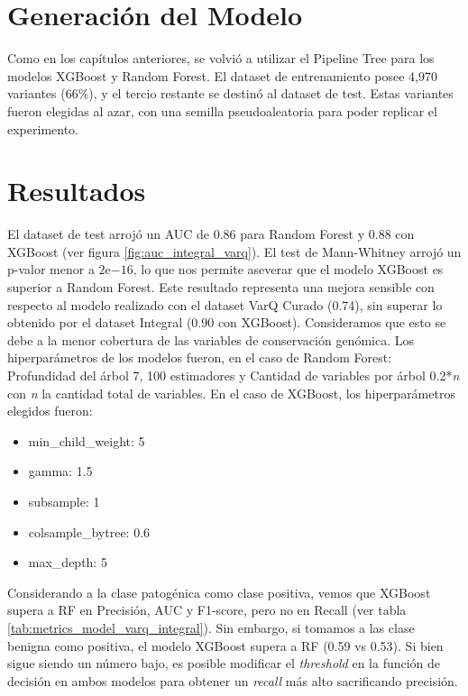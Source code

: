 \section{Generación del Modelo}
Como en los capítulos anteriores, se volvió a utilizar el Pipeline Tree para los modelos XGBoost y Random Forest. El dataset de entrenamiento posee 4,970 variantes (66\%), y el tercio restante se destinó al dataset de test. Estas variantes fueron elegidas al azar, con una semilla pseudoaleatoria para poder replicar el experimento.  

\section{Resultados}
El dataset de test arrojó un AUC de 0.86 para Random Forest y 0.88 con XGBoost (ver figura \ref{fig:auc_integral_varq}). El test de Mann-Whitney arrojó un p-valor menor a $2\mathrm{e}{-16}$, lo que nos permite aseverar que el modelo XGBoost es superior a Random Forest.  Este resultado representa una mejora sensible con respecto al modelo realizado con el dataset VarQ Curado (0.74), sin superar lo obtenido por el dataset Integral (0.90 con XGBoost). Consideramos que esto se debe a la menor cobertura de las variables de conservación genómica. Los hiperparámetros de los modelos fueron, en el caso de Random Forest: Profundidad del árbol 7, 100 estimadores y Cantidad de variables por árbol 0.2*\textit{n} con \textit{n} la cantidad total de variables. En el caso de XGBoost, los hiperparámetros elegidos fueron:

\begin{itemize}
    \item min\_child\_weight: 5
    \item gamma: 1.5
    \item subsample: 1
    \item colsample\_bytree: 0.6
    \item max\_depth: 5
\end{itemize}

Considerando a la clase patogénica como clase positiva, vemos que XGBoost supera a RF en Precisión, AUC y F1-score, pero no en Recall (ver tabla \ref{tab:metrics_model_varq_integral}). Sin embargo, si tomamos a las clase benigna como positiva, el modelo XGBoost supera a RF (0.59 vs 0.53). Si bien sigue siendo un número bajo, es posible modificar el \textit{threshold} en la función de decisión en ambos modelos para obtener un \textit{recall} más alto sacrificando precisión. 

